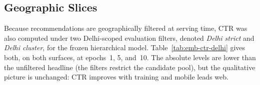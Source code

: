 \subsection{Geographic Slices}
\label{sec:emb-geo-ctr}
Because recommendations are geographically filtered at serving time, CTR was
also computed under two Delhi-scoped evaluation filters, denoted \emph{Delhi
strict} and \emph{Delhi cluster}, for the frozen hierarchical model.
Table~\ref{tab:emb-ctr-delhi} gives both, on both surfaces, at epochs~1, 5,
and~10. The absolute levels are lower than the unfiltered headline (the filters
restrict the candidate pool), but the qualitative picture is unchanged: CTR
improves with training and mobile leads web.

\begin{table}[ht]
  \centering
  \caption{Offline CTR (\%) of the frozen hierarchical softmax model under Delhi
           geographic filters, by surface and epoch, June~2025.}
  \label{tab:emb-ctr-delhi}
  \small
\end{table}

